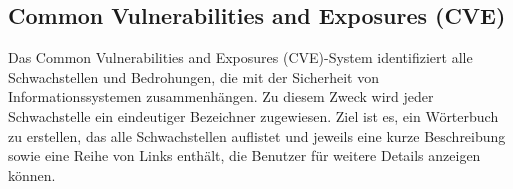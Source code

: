 \subsection{Common Vulnerabilities and Exposures (CVE)}

Das Common Vulnerabilities and Exposures (CVE)-System identifiziert alle Schwachstellen und Bedrohungen, die mit der Sicherheit von Informationssystemen zusammenhängen. Zu diesem Zweck wird jeder Schwachstelle ein eindeutiger Bezeichner zugewiesen. Ziel ist es, ein Wörterbuch zu erstellen, das alle Schwachstellen auflistet und jeweils eine kurze Beschreibung sowie eine Reihe von Links enthält, die Benutzer für weitere Details anzeigen können\cite{cve18}.\\
















